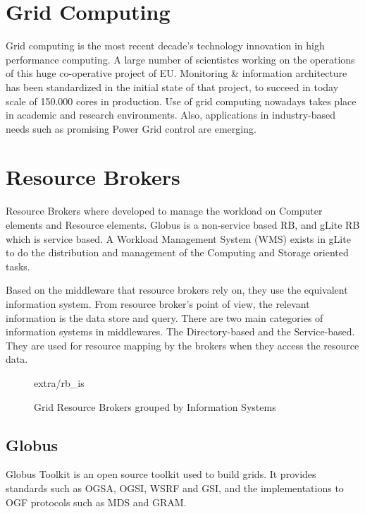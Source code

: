 \section{Grid Computing}
Grid computing \cite{li2005grid} is the most recent decade's technology
innovation in high performance computing. A large number of scientistcs working
on the operations of this huge co-operative project of EU. Monitoring \&
information architecture \cite{fisher2002datagrid} has been standardized in the
initial state of that project, to succeed in today scale of 150.000 cores in
production. Use of grid computing nowadays takes place in academic and research
environments. Also, applications in industry-based needs such as promising
Power Grid control \cite{Taylor2006} are emerging.

\section{Resource Brokers}
Resource Brokers \cite{Kertesz06ataxonomy} where developed to manage the
workload on Computer elements and Resource elements. Globus is a
non-service based RB, and gLite RB which is service based. A Workload
Management System (WMS) exists in gLite to do the distribution and management of
the Computing and Storage oriented tasks.

Based on the middleware that resource brokers rely on, they use the
equivalent information system. From resource broker's point of view, the
relevant information is the data store and query. There are two main categories
of information systems in middlewares. The Directory-based and the
Service-based. They are used for resource mapping by the brokers when they
access the resource data.

\begin{figure}
\begin{center}
 {extra/rb_is}
\caption{Grid Resource Brokers grouped by Information
Systems\cite{Kertesz06ataxonomy}}
\end{center}
\end{figure}

\subsection{Globus}

Globus Toolkit is an open source toolkit used to build grids. It provides
standards such as OGSA, OGSI, WSRF and GSI, and the implementations to OGF
protocols such as MDS and GRAM.


